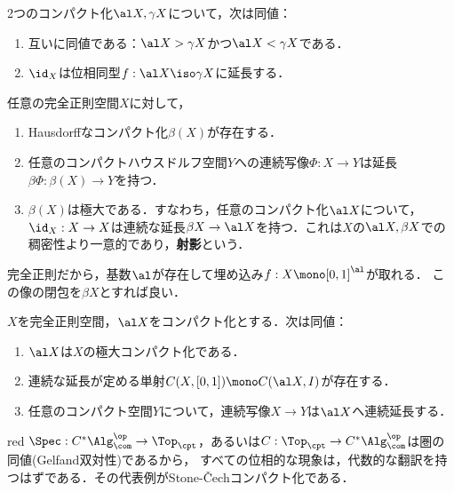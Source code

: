 \documentclass[uplatex,dvipdfmx]{jsreport}
\begin{document}
\begin{proposition}[同値なコンパクト化の特徴付け]
    2つのコンパクト化$\al X,\gamma X$について，次は同値：
    \begin{enumerate}
        \item 互いに同値である：$\al X>\gamma X$かつ$\al X<\gamma X$である．
        \item $\id_X$は位相同型$f:\al X\iso\gamma X$に延長する．
    \end{enumerate}
\end{proposition}

\begin{proposition}
    任意の完全正則空間$X$に対して，
    \begin{enumerate}
        \item  Hausdorffなコンパクト化$\beta(X)$が存在する．
        \item 任意のコンパクトハウスドルフ空間$Y$への連続写像$\Phi:X\to Y$は延長$\beta\Phi:\beta(X)\to Y$を持つ．
        \item $\beta(X)$は極大である．すなわち，任意のコンパクト化$\al X$について，$\id_X:X\to X$は連続な延長$\beta X\to\al X$を持つ．これは$X$の$\al X,\beta X$での稠密性より一意的であり，\textbf{射影}という．
    \end{enumerate}
\end{proposition}
\begin{Proof}
    完全正則だから，基数$\al$が存在して埋め込み$f:X\mono[0,1]^\al$が取れる．
    この像の閉包を$\beta X$とすれば良い．
\end{Proof}

\begin{theorem}
    $X$を完全正則空間，$\al X$をコンパクト化とする．次は同値：
    \begin{enumerate}
        \item $\al X$は$X$の極大コンパクト化である．
        \item 連続な延長が定める単射$C(X,[0,1])\mono C(\al X,I)$が存在する．
        \item 任意のコンパクト空間$Y$について，連続写像$X\to Y$は$\al X$へ連続延長する．
    \end{enumerate}
\end{theorem}

\begin{tbox}{red}{}
    $\Spec:C^*\Alg^\op_\com\to\Top_\cpt$，あるいは$C:\Top_\cpt\to C^*\Alg^\op_\com$は圏の同値(Gelfand双対性)であるから，
    すべての位相的な現象は，代数的な翻訳を持つはずである．その代表例がStone-Čechコンパクト化である．
\end{tbox}
\end{document}
